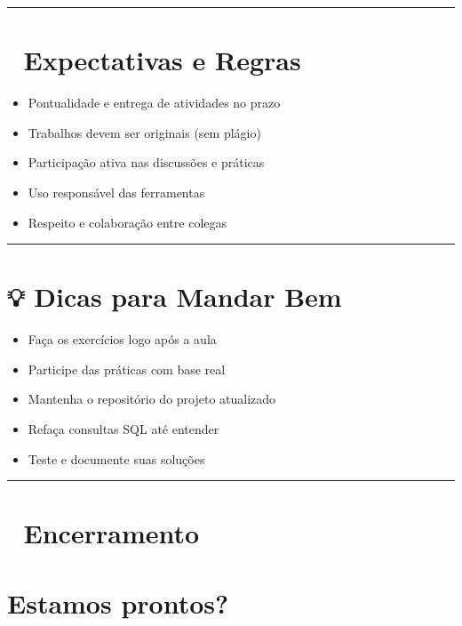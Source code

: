 \documentclass[
]{book}
\providecommand{\tightlist}{%
  \setlength{\itemsep}{0pt}\setlength{\parskip}{0pt}}
\begin{document}
\begin{center}\rule{0.5\linewidth}{0.5pt}\end{center}

\section{📌 Expectativas e Regras}\label{expectativas-e-regras}

\begin{itemize}
\tightlist
\item
  Pontualidade e entrega de atividades no prazo
\item
  Trabalhos devem ser originais (sem plágio)
\item
  Participação ativa nas discussões e práticas
\item
  Uso responsável das ferramentas
\item
  Respeito e colaboração entre colegas
\end{itemize}

\begin{center}\rule{0.5\linewidth}{0.5pt}\end{center}

\section{💡 Dicas para Mandar Bem}\label{dicas-para-mandar-bem}

\begin{itemize}
\tightlist
\item
  Faça os exercícios logo após a aula
\item
  Participe das práticas com base real
\item
  Mantenha o repositório do projeto atualizado
\item
  Refaça consultas SQL até entender
\item
  Teste e documente suas soluções
\end{itemize}

\begin{center}\rule{0.5\linewidth}{0.5pt}\end{center}

\section{🙌 Encerramento}\label{encerramento}

\section{Estamos prontos?}\label{estamos-prontos}
\end{document}
